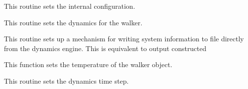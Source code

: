 \documentclass[letterpaper,10pt,english]{sphinxmanual}
\begin{document}
\begin{fulllineitems}
\begin{fulllineitems}
\end{fulllineitems}


\begin{fulllineitems}
\label{walker_api/walker_api.doc:lammpsWalker.lammpsWalker.setConfig}
This routine sets the internal configuration.

\end{fulllineitems}


\begin{fulllineitems}
\label{walker_api/walker_api.doc:lammpsWalker.lammpsWalker.setDynamics}
This routine sets the dynamics for the walker.

\end{fulllineitems}


\begin{fulllineitems}
\label{walker_api/walker_api.doc:lammpsWalker.lammpsWalker.setOutput}
This routine sets up a mechanism for writing system information to file directly from the dynamics engine. This is equivalent to output constructed

\end{fulllineitems}


\begin{fulllineitems}
\label{walker_api/walker_api.doc:lammpsWalker.lammpsWalker.setTemperature}
This function sets the temperature of the walker object.

\end{fulllineitems}


\begin{fulllineitems}
\label{walker_api/walker_api.doc:lammpsWalker.lammpsWalker.setTimestep}
This routine sets the dynamics time step.


\end{fulllineitems}
\end{fulllineitems}
\end{document}
